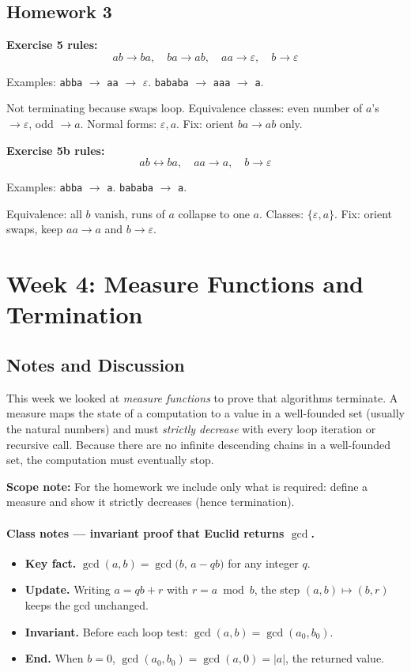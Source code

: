 \documentclass{article}
\theoremstyle{theorem}
\theoremstyle{definition}
\theoremstyle{remark}
\begin{document}
\subsection{Homework 3}
\textbf{Exercise 5 rules:}
\[
ab \to ba,\quad ba \to ab,\quad aa \to \varepsilon,\quad b \to \varepsilon
\]

Examples: \texttt{abba} $\to$ \texttt{aa} $\to$ $\varepsilon$.  
\texttt{bababa} $\to$ \texttt{aaa} $\to$ \texttt{a}.  

Not terminating because swaps loop.  
Equivalence classes: even number of $a$’s $\to \varepsilon$, odd $\to a$.  
Normal forms: $\varepsilon, a$.  
Fix: orient $ba \to ab$ only.  

\textbf{Exercise 5b rules:}
\[
ab \leftrightarrow ba,\quad aa \to a,\quad b \to \varepsilon
\]

Examples: \texttt{abba} $\to$ \texttt{a}. \texttt{bababa} $\to$ \texttt{a}.  

Equivalence: all $b$ vanish, runs of $a$ collapse to one $a$.  
Classes: $\{\varepsilon,a\}$.  
Fix: orient swaps, keep $aa \to a$ and $b \to \varepsilon$.  

\section{Week 4: Measure Functions and Termination}

\subsection{Notes and Discussion}
This week we looked at \emph{measure functions} to prove that algorithms terminate.
A measure maps the state of a computation to a value in a well-founded set (usually the natural numbers) and must
\emph{strictly decrease} with every loop iteration or recursive call. Because there are no infinite descending chains in a well-founded set, the computation must eventually stop.

\textbf{Scope note:} For the homework we include only what is required: define a measure and show it strictly decreases (hence termination).

\paragraph{Class notes — invariant proof that Euclid returns $\gcd$.}
\begin{itemize}
  \item \textbf{Key fact.} $\gcd(a,b)=\gcd\!\big(b,\,a-qb\big)$ for any integer $q$.
  \item \textbf{Update.} Writing $a=qb+r$ with $r=a\bmod b$, the step $(a,b)\mapsto(b,r)$ keeps the gcd unchanged.
  \item \textbf{Invariant.} Before each loop test: $\gcd(a,b)=\gcd(a_0,b_0)$.
  \item \textbf{End.} When $b=0$, $\gcd(a_0,b_0)=\gcd(a,0)=|a|$, the returned value.
\end{itemize}
\end{document}
